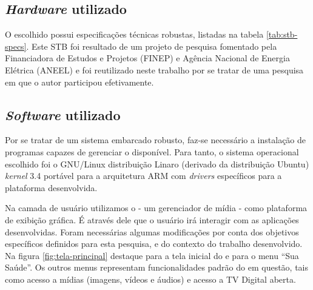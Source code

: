 

\subsection{\textit{Hardware} utilizado}

O \stb[] escolhido possui especificações técnicas robustas, listadas na 
tabela \ref{tab:stb-specs}. Este STB foi resultado de um projeto de pesquisa
fomentado pela Financiadora de Estudos e Projetos (FINEP) e Agência Nacional
de Energia Elétrica (ANEEL) e foi reutilizado neste trabalho por se tratar de 
uma pesquisa em que o autor participou efetivamente.


\subsection{\textit{Software} utilizado}

Por se tratar de um sistema embarcado robusto, faz-se necessário a instalação
de programas capazes de gerenciar o \hardware[] disponível. Para tanto, o
sistema operacional escolhido foi o GNU/Linux distribuição Linaro (derivado da
distribuição Ubuntu) \textit{kernel} 3.4 portável para a arquitetura 
ARM com \textit{drivers} específicos para a plataforma desenvolvida.


Na camada de usuário utilizamos o \software[] \xbmc[] - um gerenciador de mídia
- como plataforma de exibição gráfica. É através dele que o usuário irá 
interagir com as aplicações desenvolvidas. Foram necessárias algumas 
modificações por conta dos objetivos específicos definidos para esta pesquisa,
e do contexto do trabalho desenvolvido. Na figura \ref{fig:tela-principal}
destaque para a tela inicial do \software[] \xbmc[] e para o menu ``Sua Saúde''.
Os outros menus representam funcionalidades padrão do \software[] em questão,
tais como acesso a mídias (imagens, vídeos e áudios) e acesso a TV Digital aberta.


